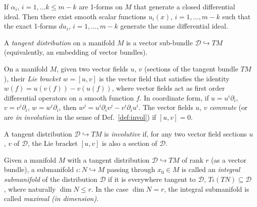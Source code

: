 \begin{definition} \label{def:forms}
\notready
\end{definition}

\begin{definition} \label{def:diff-ideal}
\notready
\end{definition}

\begin{theorem} \label{thm:frob-forms}
If $\alpha_i$, $i=1,\ldots k\le m-k$ are 1-forms on $M$ that generate a closed
differential ideal. Then there exist smooth scalar functions $u_i(x)$,
$i=1,\ldots,m-k$ such that the exact 1-forms $du_i$, $i=1,\ldots,m-k$ generate
the same differential ideal.
\end{theorem}

\begin{definition} \label{def:vec-dist}
A \emph{tangent distribution} on a manifold $M$ is a vector sub-bundle
$\mathcal{D}\hookrightarrow TM$ (equivalently, an embedding of vector bundles).
\end{definition}

\begin{definition} \label{def:lie}
On a manifold $M$, given two vector fields $u$, $v$ (sections of the tangent
bundle $TM$), their \emph{Lie bracket} $w = [u,v]$ is the vector field that
satisfies the identity $w(f) = u(v(f)) - v(u(f))$, where vector fields act as
first order differential operators on a smooth function $f$. In coordinate form,
if $u = u^i\partial_i$, $v = v^i\partial_i$, $w = w^i\partial_i$, then $w^j =
u^i \partial_i v^j - v^i \partial_i u^i$. The vector fields $u$, $v$
\emph{commute} (or are \emph{in involution} in the sense of
Def.~\ref{def:invol}) if $[u,v] = 0$.
\end{definition}

\begin{definition} \label{def:inv-distr}
A tangent distribution $\mathcal{D} \hookrightarrow TM$ is \emph{involutive} if,
for any two vector field sections $u$, $v$ of $\mathcal{D}$, the Lie bracket
$[u,v]$ is also a section of $\mathcal{D}$.
\end{definition}

\begin{definition} \label{def:int-subman}
Given a manifold $M$ with a tangent distribution $\mathcal{D} \hookrightarrow
TM$ of rank $r$ (as a vector bundle), a submanifold $\iota\colon N
\hookrightarrow M$ passing through $x_0 \in M$ is called an \emph{integral
submanifold} of the distribution $\mathcal{D}$ if it is everywhere tangent to
$\mathcal{D}$, $T\iota (TN) \subseteq \mathcal{D}$, where naturally $\dim N \le
r$. In the case $\dim N = r$, the integral submanifold is called \emph{maximal
(in dimension)}.
\end{definition}

